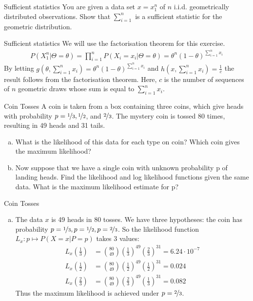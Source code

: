 \documentclass[14pt]{beamer}
\begin{document}
\begin{frame}{Sufficient statistics}
You are given a data set $ x=x_{1}^{n} $ of $ n $ i.i.d. geometrically distributed observations.
Show that $ \sum_{i=1}^{n} $ is a sufficient statistic for the geometric distribution.
\end{frame}

\begin{frame}{Sufficient statistics}
\small
We will use the factorisation theorem for this exercise.
\begin{align*}
P(X_{1}^{n}|\Theta=\theta) = \prod_{i=1}^{n}P(X_{i}=x_{i}|\Theta=\theta)
= \theta^{n} (1-\theta)^{\sum_{i=1}^{n}x_{i}}
\end{align*}
By letting $ g(\theta, \sum_{i=1}^{n}x_{i}) = \theta^{n} (1-\theta)^{\sum_{i=1}^{n}x_{i}} $ 
and $ h(x,\sum_{i=1}^{n}x_{i}) = \frac{1}{c} $ the result follows from
the factorisation theorem. Here, $ c $ is the number of sequences of $ n $ geometric draws whose
sum is equal to $ \sum_{i=1}^{n}x_{i} $.
\end{frame}

\begin{frame}{Coin Tosses}
\small
A coin is taken from a box containing three coins, which give heads
with probability $ p = \nicefrac{1}{3} , \nicefrac{1}{2} $, and $ \nicefrac{2}{3}$. The mystery coin is 
tossed 80 times, resulting in 49 heads and 31 tails.
\begin{enumerate}[a)]
\item What is the likelihood of this data for each type on coin? Which
coin gives the maximum likelihood?
\item Now suppose that we have a single coin with unknown probability
p of landing heads. Find the likelihood and log likelihood functions
given the same data. What is the maximum likelihood estimate for p?
\end{enumerate}
\end{frame}

\begin{frame}{Coin Tosses}
\small
\begin{enumerate}[a)]
\item The data $ x $ is 49 heads in 80 tosses.
We have three hypotheses: the coin has probability
$ p = \nicefrac{1}{3}, p = \nicefrac{1}{2}, p = \nicefrac{2}{3} $. So the likelihood function $ L_{x} : p \mapsto P(X=x|P=p) $ takes 3 values:
\begin{align*}
L_{x}(\frac{1}{3}) &= \binom{80}{49}\left(\frac{1}{3}\right)^{49}\left(\frac{2}{3}\right)^{31} = 6.24 \cdot 10^{-7} \\
L_{x}(\frac{1}{2}) &= \binom{80}{49}\left(\frac{1}{2}\right)^{49}\left(\frac{1}{2}\right)^{31} = 0.024 \\
L_{x}(\frac{2}{3}) &= \binom{80}{49}\left(\frac{2}{3}\right)^{49}\left(\frac{1}{3}\right)^{31} = 0.082
\end{align*}
Thus the maximum likelihood is achieved under $ p = \nicefrac{2}{3} $.
\end{enumerate}
\end{frame}
\end{document}
